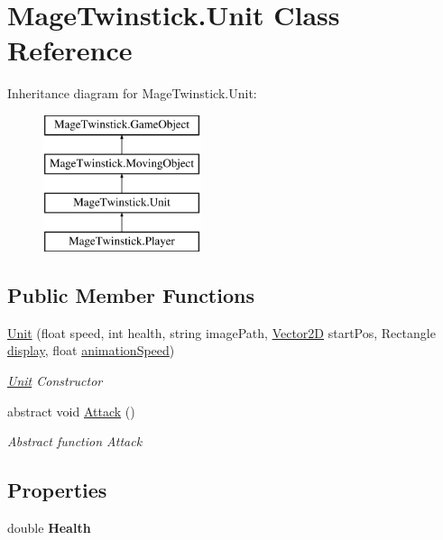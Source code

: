 \hypertarget{class_mage_twinstick_1_1_unit}{}\section{Mage\+Twinstick.\+Unit Class Reference}
\label{class_mage_twinstick_1_1_unit}
Inheritance diagram for Mage\+Twinstick.\+Unit\+:\begin{figure}[H]
\begin{center}
\leavevmode
\includegraphics[height=4.000000cm]{class_mage_twinstick_1_1_unit}
\end{center}
\end{figure}
\subsection*{Public Member Functions}
\begin{DoxyCompactItemize}
\item 
\hyperlink{class_mage_twinstick_1_1_unit_a857d0f6e0f55b4c81e2a3bbf8711dd18}{Unit} (float speed, int health, string image\+Path, \hyperlink{class_mage_twinstick_1_1_vector2_d}{Vector2\+D} start\+Pos, Rectangle \hyperlink{class_mage_twinstick_1_1_game_object_a5807df7f837dc87c8955a008d0b27b50}{display}, float \hyperlink{class_mage_twinstick_1_1_game_object_a5d21c31402c27c5a19f2a62d98720456}{animation\+Speed})
\begin{DoxyCompactList}\small\item\em \hyperlink{class_mage_twinstick_1_1_unit}{Unit} Constructor \end{DoxyCompactList}\item 
abstract void \hyperlink{class_mage_twinstick_1_1_unit_a98b69920e6c6c09c5cfaacbf42a31bbf}{Attack} ()
\begin{DoxyCompactList}\small\item\em Abstract function Attack \end{DoxyCompactList}\end{DoxyCompactItemize}
\subsection*{Properties}
\begin{DoxyCompactItemize}
\item 
\hypertarget{class_mage_twinstick_1_1_unit_a5c06094e798c41a5d484f6ee00757667}{}double {\bfseries Health}\label{class_mage_twinstick_1_1_unit_a5c06094e798c41a5d484f6ee00757667}

\end{DoxyCompactItemize}
